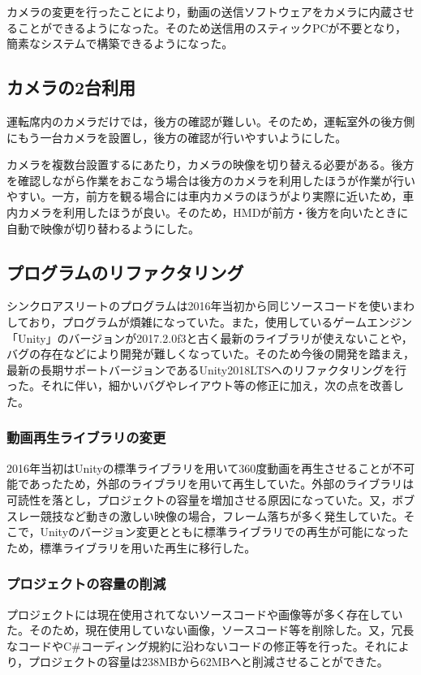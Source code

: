 \documentclass[a4paper,12pt]{jsarticle}
\begin{document}
カメラの変更を行ったことにより，動画の送信ソフトウェアをカメラに内蔵させることができるようになった。そのため送信用のスティックPCが不要となり，簡素なシステムで構築できるようになった。

\subsection{カメラの2台利用}
運転席内のカメラだけでは，後方の確認が難しい。そのため，運転室外の後方側にもう一台カメラを設置し，後方の確認が行いやすいようにした。

カメラを複数台設置するにあたり，カメラの映像を切り替える必要がある。後方を確認しながら作業をおこなう場合は後方のカメラを利用したほうが作業が行いやすい。一方，前方を観る場合には車内カメラのほうがより実際に近いため，車内カメラを利用したほうが良い。そのため，HMDが前方・後方を向いたときに自動で映像が切り替わるようにした。

\subsection{プログラムのリファクタリング}
シンクロアスリートのプログラムは2016年当初から同じソースコードを使いまわしており，プログラムが煩雑になっていた。また，使用しているゲームエンジン「Unity」のバージョンが2017.2.0f3と古く最新のライブラリが使えないことや，バグの存在などにより開発が難しくなっていた。そのため今後の開発を踏まえ，最新の長期サポートバージョンであるUnity2018LTSへのリファクタリングを行った。それに伴い，細かいバグやレイアウト等の修正に加え，次の点を改善した。

\subsubsection{動画再生ライブラリの変更}
2016年当初はUnityの標準ライブラリを用いて360度動画を再生させることが不可能であったため，外部のライブラリを用いて再生していた。外部のライブラリは可読性を落とし，プロジェクトの容量を増加させる原因になっていた。又，ボブスレー競技など動きの激しい映像の場合，フレーム落ちが多く発生していた。そこで，Unityのバージョン変更とともに標準ライブラリでの再生が可能になったため，標準ライブラリを用いた再生に移行した。

\subsubsection{プロジェクトの容量の削減}
プロジェクトには現在使用されてないソースコードや画像等が多く存在していた。そのため，現在使用していない画像，ソースコード等を削除した。又，冗長なコードやC\#コーディング規約に沿わないコードの修正等を行った。それにより，プロジェクトの容量は238MBから62MBへと削減させることができた。
\clearpage
\end{document}
